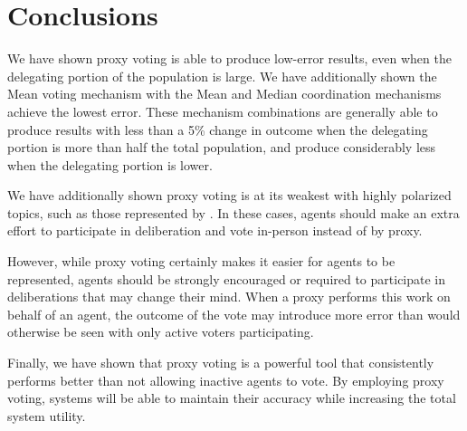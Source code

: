 \section{Conclusions}\label{sec:conclusions}
We have shown proxy voting is able to produce low-error results, even when the
delegating portion of the population is large.
We have additionally shown the Mean voting mechanism with the Mean and Median
coordination mechanisms achieve the lowest error.
These mechanism combinations are generally able to produce results with less than a 5\%
change in outcome when the delegating portion is more than half the total
population, and produce considerably less when the delegating portion is lower.

We have additionally shown proxy voting is at its weakest with highly polarized
topics, such as those represented by .
In these cases, agents should make an extra effort to participate in deliberation and
vote in-person instead of by proxy.

However, while proxy voting certainly makes it easier for agents to be represented,
agents should be strongly encouraged or required to participate in deliberations that
may change their mind.
When a proxy performs this work on behalf of an agent, the outcome of the vote may
introduce more error than would otherwise be seen with only active voters participating.

Finally, we have shown that proxy voting is a powerful tool that consistently
performs better than not allowing inactive agents to vote.
By employing proxy voting, systems will be able to maintain their accuracy while
increasing the total system utility.

